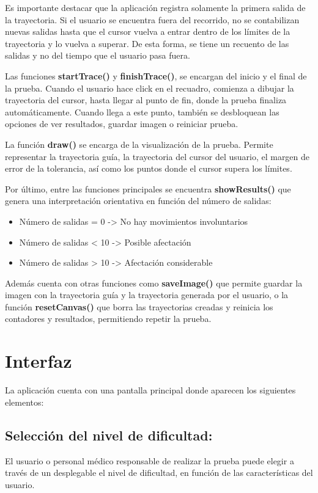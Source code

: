 Es importante destacar que la aplicación registra solamente la primera salida de la trayectoria. Si el usuario se encuentra fuera del recorrido, no se contabilizan nuevas salidas hasta que el cursor vuelva a entrar dentro de los límites de la trayectoria y lo vuelva a superar. De esta forma, se tiene un recuento de las salidas y no del tiempo que el usuario pasa fuera.

Las funciones \textbf{startTrace()} y \textbf{finishTrace()}, se encargan del inicio y el final de la prueba. Cuando el usuario hace click en el recuadro, comienza a dibujar la trayectoria del cursor, hasta llegar al punto de fin, donde la prueba finaliza automáticamente. Cuando llega a este punto, también se desbloquean las opciones de ver resultados, guardar imagen o reiniciar prueba.

 La función \textbf{draw()} se encarga de la visualización de la prueba. Permite representar la trayectoria guía, la trayectoria del cursor del usuario, el margen de error de la tolerancia, así como los puntos donde el cursor supera los límites.

Por último, entre las funciones principales se encuentra \textbf{showResults()} que genera una interpretación orientativa en función del número de salidas:
	\begin{itemize}
	\item Número de salidas = 0 -> No hay movimientos involuntarios
	\item Número de salidas < 10 -> Posible afectación
	\item Número de salidas > 10 -> Afectación considerable
	\end{itemize}
	
Además cuenta con otras funciones como \textbf{saveImage()} que permite guardar la imagen con la trayectoria guía y la trayectoria generada por el usuario, o la función \textbf{resetCanvas()} que borra las trayectorias creadas y reinicia los contadores y resultados, permitiendo repetir la prueba.

\section{Interfaz}

La aplicación cuenta con una pantalla principal donde aparecen los siguientes elementos:

\subsection{Selección del nivel de dificultad:}
El usuario o personal médico responsable de realizar la prueba puede elegir a través de un desplegable el nivel de dificultad, en función de las características del usuario.

